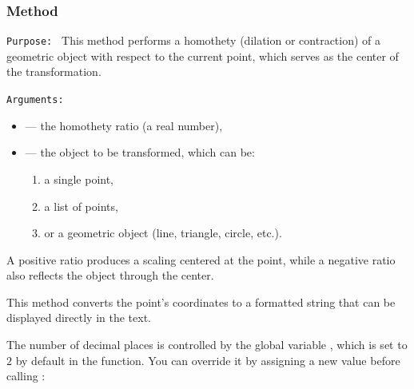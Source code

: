 \subsubsection{Method }
\label{ssub:method_point_homothety_k_obj}

\texttt{Purpose: } This method performs a homothety (dilation or contraction) of a geometric object with respect to the current point, which serves as the center of the transformation.

\medskip

\texttt{Arguments: }
\begin{itemize}
  \item {} — the homothety ratio (a real number),
  \item {} — the object to be transformed, which can be:
  \begin{enumerate}
    \item a single point,
    \item a list of points,
    \item or a geometric object (line, triangle, circle, etc.).
  \end{enumerate}
\end{itemize}


A positive ratio  produces a scaling centered at the point, while a negative ratio also reflects the object through the center.

\vspace{1em}

\begin{tkzexample}[latex=7cm]
\begin{center}
\end{center}
\end{tkzexample}

 This method converts the point’s coordinates to a formatted string that can be displayed directly in the text.

\medskip

The number of decimal places is controlled by the global variable , which is set to $2$ by default in the  function. You can override it by assigning a new value before calling :

